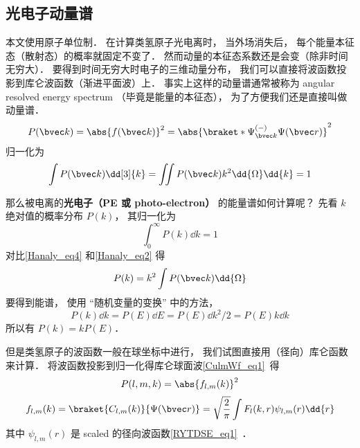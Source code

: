 

\subsection{光电子动量谱}

本文使用原子单位制． 在计算类氢原子光电离时， 当外场消失后， 每个能量本征态（散射态）的概率就固定不变了． 然而动量的本征态系数还是会变（除非时间无穷大）． 要得到时间无穷大时电子的三维动量分布， 我们可以直接将波函数投影到库仑波函数（渐进平面波）上． 事实上这样的动量谱通常被称为 angular resolved energy spectrum （毕竟是能量的本征态）， 为了方便我们还是直接叫做动量谱．
\begin{equation}
P(\bvec k) = \abs{f(\bvec k)}^2 = \abs{\braket*{\Psi^{(-)}_{\bvec k}}{\Psi(\bvec r)}}^2
\end{equation}
归一化为
\begin{equation}\label{Hanaly_eq4}
\int P(\bvec k) \dd[3]{k} = \iint P(\bvec k) k^2\dd{\Omega}\dd{k} = 1
\end{equation}

那么被电离的\textbf{光电子（PE 或 photo-electron）} 的能量谱如何计算呢？ 先看 $k$ 绝对值的概率分布 $P(k)$， 其归一化为
\begin{equation}\label{Hanaly_eq2}
\int_0^\infty P(k) \dd{k} = 1
\end{equation}
对比\autoref{Hanaly_eq4} 和\autoref{Hanaly_eq2} 得
\begin{equation}
P(k) = k^2 \int P(\bvec k) \dd{\Omega}
\end{equation}
要得到能谱， 使用 “随机变量的变换” 中的方法，
\begin{equation}\label{Hanaly_eq1}
P(k)\dd{k} = P(E)\dd{E} = P(E)\dd{k^2/2} = P(E)k\dd{k}
\end{equation}
所以有 $P(k) = kP(E)$．



但是类氢原子的波函数一般在球坐标中进行， 我们试图直接用（径向）库仑函数来计算． 将波函数投影到归一化得库仑球面波\autoref{CulmWf_eq1}~得
\begin{equation}
P(l, m, k) = \abs{f_{l,m}(k)}^2 
\end{equation}
\begin{equation}
f_{l,m}(k) = \braket{C_{l,m}(k)}{\Psi(\bvec r)} = \sqrt{\frac{2}{\pi}} \int F_l(k, r) \psi_{l,m}(r) \dd{r}
\end{equation}
其中 $\psi_{l,m}(r)$ 是 scaled 的径向波函数\autoref{RYTDSE_eq1}~．

